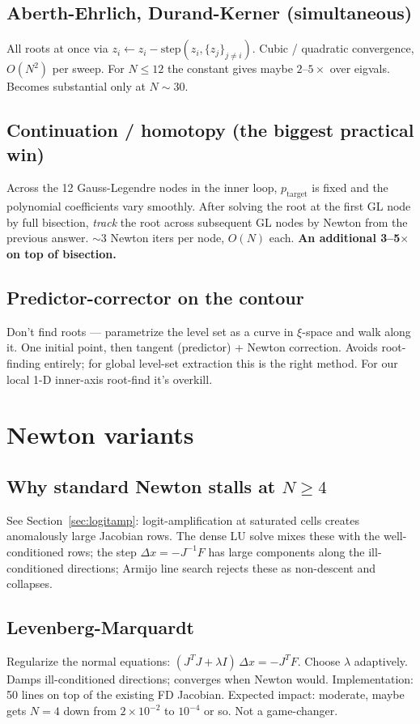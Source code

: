 \documentclass[11pt]{article}
\begin{document}
\subsection{Aberth-Ehrlich, Durand-Kerner (simultaneous)}
All roots at once via $z_i \leftarrow z_i - \mathrm{step}(z_i, \{z_j\}_{j\neq i})$.
Cubic / quadratic convergence, $O(N^2)$ per sweep. For $N\le 12$ the constant gives
maybe $2$--$5\times$ over eigvals. Becomes substantial only at $N\sim 30$.

\subsection{Continuation / homotopy (the biggest practical win)}
Across the 12 Gauss-Legendre nodes in the inner loop, $p_{\mathrm{target}}$ is fixed
and the polynomial coefficients vary smoothly. After solving the root at the first GL
node by full bisection, \emph{track} the root across subsequent GL nodes by Newton from
the previous answer. $\sim 3$ Newton iters per node, $O(N)$ each. \textbf{An additional
3--5$\times$ on top of bisection.}

\subsection{Predictor-corrector on the contour}
Don't find roots — parametrize the level set as a curve in $\xi$-space and walk along
it. One initial point, then tangent (predictor) + Newton correction. Avoids root-finding
entirely; for global level-set extraction this is the right method. For our local 1-D
inner-axis root-find it's overkill.

\section{Newton variants}

\subsection{Why standard Newton stalls at $N\ge 4$}
See Section~\ref{sec:logitamp}: logit-amplification at saturated cells creates anomalously
large Jacobian rows. The dense LU solve mixes these with the well-conditioned rows; the
step $\Delta x = -J^{-1}F$ has large components along the ill-conditioned directions;
Armijo line search rejects these as non-descent and collapses.

\subsection{Levenberg-Marquardt}
Regularize the normal equations: $(J^TJ + \lambda I)\,\Delta x = -J^T F$. Choose
$\lambda$ adaptively. Damps ill-conditioned directions; converges when Newton would.
Implementation: 50 lines on top of the existing FD Jacobian. Expected impact: moderate,
maybe gets $N=4$ down from $2\times 10^{-2}$ to $10^{-4}$ or so. Not a game-changer.
\end{document}
